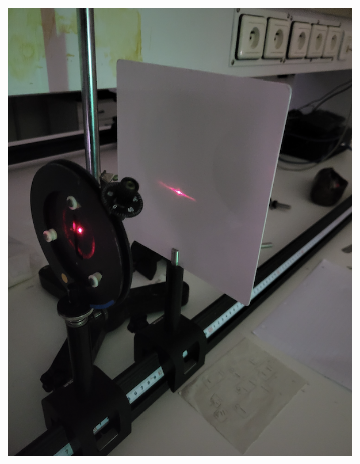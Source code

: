 \documentclass{article}
\begin{document}
\begin{figure}[H]
    \centering
    \begin{subfigure}[b]{0.3\textwidth}
        \includegraphics[width=\textwidth]{figs/fraunhofer_1.png}
        \caption{}\label{fig:fraunhofer_1}
    \end{subfigure}
    \begin{subfigure}[b]{0.3\textwidth}

\end{subfigure}
\end{figure}
\end{document}
